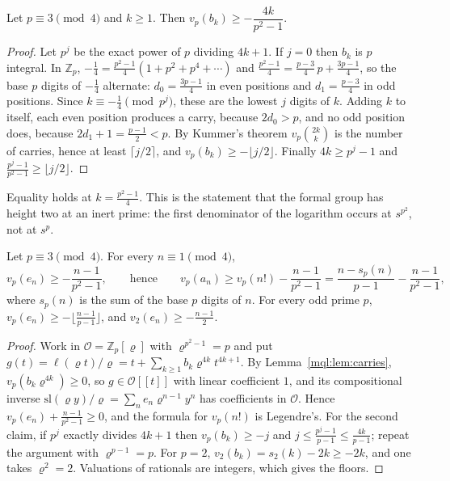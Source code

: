 \begin{lemma}[Carries]\label{mql:lem:carries}
Let $p\equiv3\pmod4$ and $k\ge1$. Then $v_p(b_k)\ge-\dfrac{4k}{p^2-1}$.
\end{lemma}

\begin{proof}
Let $p^j$ be the exact power of $p$ dividing $4k+1$. If $j=0$ then $b_k$ is $p$ integral. In $\mathbb Z_p$, $-\frac14=\frac{p^2-1}4(1+p^2+p^4+\cdots)$ and $\frac{p^2-1}{4}=\frac{p-3}4\,p+\frac{3p-1}4$, so the base $p$ digits of $-\frac14$ alternate: $d_0=\frac{3p-1}4$ in even positions and $d_1=\frac{p-3}4$ in odd positions. Since $k\equiv-\frac14\pmod{p^j}$, these are the lowest $j$ digits of $k$. Adding $k$ to itself, each even position produces a carry, because $2d_0>p$, and no odd position does, because $2d_1+1=\frac{p-1}2<p$. By Kummer's theorem $v_p\binom{2k}k$ is the number of carries, hence at least $\lceil j/2\rceil$, and $v_p(b_k)\ge-\lfloor j/2\rfloor$. Finally $4k\ge p^j-1$ and $\frac{p^j-1}{p^2-1}\ge\lfloor j/2\rfloor$.
\end{proof}

Equality holds at $k=\frac{p^2-1}4$. This is the statement that the formal group has height two at an inert prime: the first denominator of the logarithm occurs at $s^{p^2}$, not at $s^p$.

\begin{theorem}\label{mql:thm:div}
Let $p\equiv3\pmod4$. For every $n\equiv1\pmod4$,
\[
v_p(e_n)\ge-\frac{n-1}{p^2-1},\qquad\text{hence}\qquad v_p(a_n)\ge v_p(n!)-\frac{n-1}{p^2-1}=\frac{n-s_p(n)}{p-1}-\frac{n-1}{p^2-1},
\]
where $s_p(n)$ is the sum of the base $p$ digits of $n$. For every odd prime $p$, $v_p(e_n)\ge-\lfloor\frac{n-1}{p-1}\rfloor$, and $v_2(e_n)\ge-\frac{n-1}2$.
\end{theorem}

\begin{proof}
Work in $\mathcal O=\mathbb Z_p[\varrho]$ with $\varrho^{p^2-1}=p$ and put $g(t)=\ell(\varrho t)/\varrho=t+\sum_{k\ge1}b_k\varrho^{4k}t^{4k+1}$. By Lemma~\ref{mql:lem:carries}, $v_p(b_k\varrho^{4k})\ge0$, so $g\in\mathcal O[[t]]$ with linear coefficient $1$, and its compositional inverse $\mathrm{sl}(\varrho y)/\varrho=\sum_ne_n\varrho^{n-1}y^n$ has coefficients in $\mathcal O$. Hence $v_p(e_n)+\frac{n-1}{p^2-1}\ge0$, and the formula for $v_p(n!)$ is Legendre's. For the second claim, if $p^j$ exactly divides $4k+1$ then $v_p(b_k)\ge-j$ and $j\le\frac{p^j-1}{p-1}\le\frac{4k}{p-1}$; repeat the argument with $\varrho^{p-1}=p$. For $p=2$, $v_2(b_k)=s_2(k)-2k\ge-2k$, and one takes $\varrho^2=2$. Valuations of rationals are integers, which gives the floors.
\end{proof}

